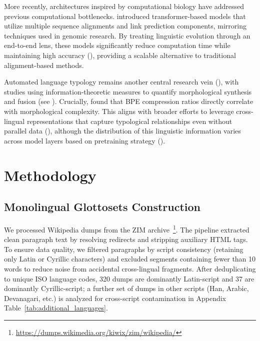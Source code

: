 \documentclass[11pt]{article}
\begin{document}
More recently, architectures inspired by computational biology have addressed previous computational bottlenecks. \citet{akavarapu2024automated} introduced transformer-based models that utilize multiple sequence alignments and link prediction components, mirroring techniques used in genomic research. By treating linguistic evolution through an end-to-end lens, these models significantly reduce computation time while maintaining high accuracy (\citealt{doi:10.1073/pnas.1204678110}), providing a scalable alternative to traditional alignment-based methods.

Automated language typology remains another central research vein (\citealt{ponti-etal-2019-modeling}), with studies using information-theoretic measures to quantify morphological synthesis and fusion (see \citealt{rathi-etal-2021-information, oncevay-etal-2022-quantifying}). Crucially, \citet{gutierrez-vasques-etal-2023-languages} found that BPE compression ratios directly correlate with morphological complexity. This aligns with broader efforts to leverage cross-lingual representations that capture typological relationships even without parallel data (\citealt{yu2021language}), although the distribution of this linguistic information varies across model layers based on pretraining strategy (\citealt{choenni2022investigating}).

\section{Methodology}

\subsection{Monolingual Glottosets Construction}
\label{sec:glottoset}

We processed Wikipedia dumps from the ZIM archive~\footnote{\url{https://dumps.wikimedia.org/kiwix/zim/wikipedia/}}. The pipeline extracted clean paragraph text by resolving redirects and stripping auxiliary HTML tags. To ensure data quality, we filtered paragraphs by script consistency (retaining only Latin or Cyrillic characters) and excluded segments containing fewer than 10 words to reduce noise from accidental cross-lingual fragments. After deduplicating to unique ISO language codes, 320 dumps are dominantly Latin-script and 37 are dominantly Cyrillic-script; a further set of dumps in other scripts (Han, Arabic, Devanagari, etc.) is analyzed for cross-script contamination in Appendix Table~\ref{tab:additional_languages}.
\end{document}

